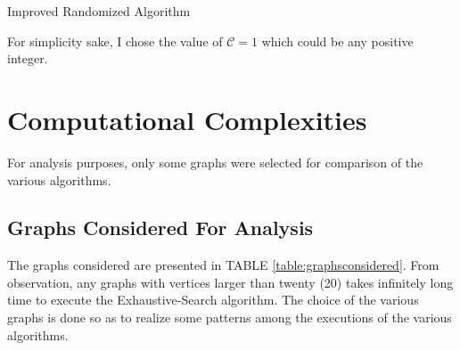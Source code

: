 \documentclass[longpaper, english, final, times]{revdetua}
\begin{document}
			\begin{algorithm}[h]
				\caption{Improved Randomized Algorithm}
				\label{algotithm:ImprovedProbabilisticRandomized}
				\DontPrintSemicolon
				
				
				
				
			\end{algorithm}
		
		For simplicity sake, I chose the value of $\mathcal{C}=1$ which could be any positive integer.
		
	\section{Computational Complexities}
		For analysis purposes, only some graphs were selected for comparison of the various algorithms. 
		
		\subsection{Graphs Considered For Analysis}
			The graphs considered are presented in TABLE \ref{table:graphsconsidered}. From observation, any graphs with vertices larger than twenty (20) takes infinitely long time to execute the Exhaustive-Search algorithm. The choice of the various graphs is done so as to realize some patterns among the executions of the various algorithms.
			
\end{document}

